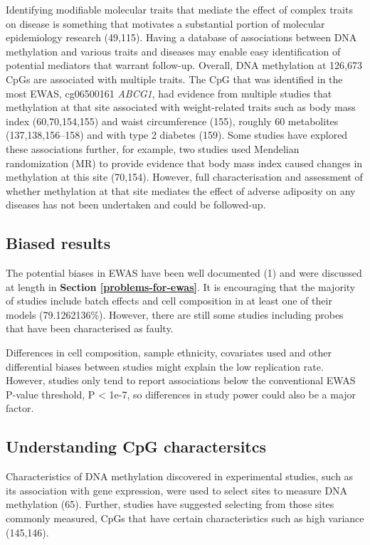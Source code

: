 \documentclass[11pt,oneside]{bristolthesis}
\begin{document}
Identifying modifiable molecular traits that mediate the effect of complex traits on disease is something that motivates a substantial portion of molecular epidemiology research (49,115). Having a database of associations between DNA methylation and various traits and diseases may enable easy identification of potential mediators that warrant follow-up. Overall, DNA methylation at 126,673 CpGs are associated with multiple traits. The CpG that was identified in the most EWAS, cg06500161 \emph{ABCG1}, had evidence from multiple studies that methylation at that site associated with weight-related traits such as body mass index (60,70,154,155) and waist circumference (155), roughly 60 metabolites (137,138,156--158) and with type 2 diabetes (159). Some studies have explored these associations further, for example, two studies used Mendelian randomization (MR) to provide evidence that body mass index caused changes in methylation at this site (70,154). However, full characterisation and assessment of whether methylation at that site mediates the effect of adverse adiposity on any diseases has not been undertaken and could be followed-up.

\hypertarget{biased-results}{%
\subsection{Biased results}\label{biased-results}}

The potential biases in EWAS have been well documented (1) and were discussed at length in \textbf{Section \ref{problems-for-ewas}}. It is encouraging that the majority of studies include batch effects and cell composition in at least one of their models (79.1262136\%). However, there are still some studies including probes that have been characterised as faulty.

Differences in cell composition, sample ethnicity, covariates used and other differential biases between studies might explain the low replication rate. However, studies only tend to report associations below the conventional EWAS P-value threshold, P \textless{} 1e-7, so differences in study power could also be a major factor.

\hypertarget{understanding-cpg-characteristics}{%
\subsection{Understanding CpG charactersitcs}\label{understanding-cpg-characteristics}}

Characteristics of DNA methylation discovered in experimental studies, such as its association with gene expression, were used to select sites to measure DNA methylation (65). Further, studies have suggested selecting from those sites commonly measured, CpGs that have certain characteristics such as high variance (145,146).
\end{document}
